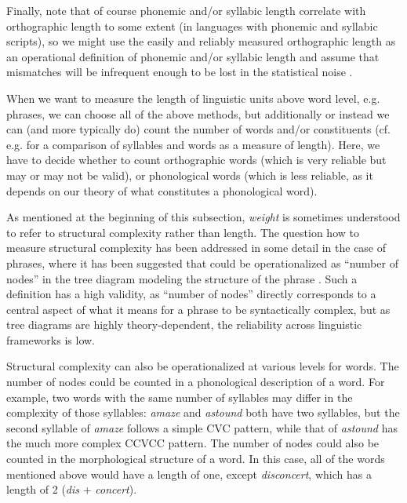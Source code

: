 Finally, note that of course phonemic  and\slash or syllabic length  correlate  with orthographic length to some extent (in languages with phonemic and syllabic  scripts), so we might use the easily and reliably  measured  orthographic length  as an operational  definition of phonemic and\slash or syllabic length and assume that mismatches will be infrequent enough to be lost in the statistical noise \citep[cf.][]{wulff_multifactorial_2003}.

When we want to measure  the length  of linguistic units above word level, e.g. phrases, we can choose all of the above methods, but additionally or instead we can (and more typically do) count the number of words and\slash or constituents (cf. e.g. \citet{gries_multifactorial_2003} for a comparison of syllables  and words as a measure  of length).  Here, we have to decide whether to count orthographic words (which is very reliable  but may or may not be valid),  or phonological words (which is less reliable, as it depends on our theory of what constitutes a phonological word).

As mentioned at the beginning of this subsection, \emph{weight}  is sometimes understood to refer to structural complexity  rather than length.  The question how to measure  structural complexity has been addressed in some detail in the case of phrases, where it has been suggested that  could be operationalized  as ``number of nodes'' in the tree diagram modeling the structure of the phrase \citep[cf.][]{wasow_post-verbal_2003}. Such a definition has a high validity,  as ``number of nodes'' directly corresponds to a central aspect of what it means for a phrase to be syntactically  complex,  but as tree diagrams are highly theory\hyp{}dependent, the reliability  across linguistic frameworks is low.

Structural complexity  can also be operationalized  at various levels for words. The number of nodes could be counted in a phonological description of a word. For example, two words with the same number of syllables may differ in the complexity of those syllables:  \textit{amaze} and \textit{astound} both have two syllables, but the second syllable of \textit{amaze} follows a simple CVC pattern, while that of \textit{astound} has the much more complex  CCVCC pattern. The number of nodes could also be counted in the morphological  structure of a word. In this case, all of the words mentioned above would have a length  of one, except \textit{disconcert}, which has a length of 2 (\textit{dis} + \textit{concert}).

